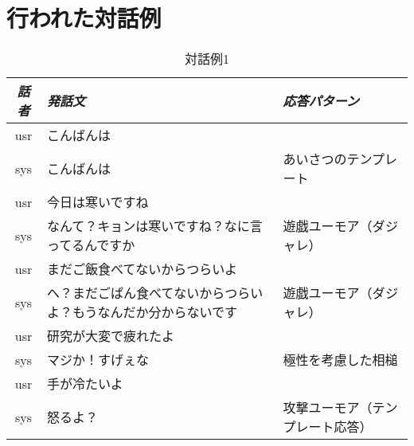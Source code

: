\section{行われた対話例}


\begin{longtable}[l]{| c | p{} | p{}|}
\caption{対話例1}
\label{fig:samplenoboke}
\endhead
\hline
{\em 話者} & {\em 発話文} & {\em 応答パターン}\\
\hline
\hline
usr & こんばんは & \\
sys & こんばんは & あいさつのテンプレート \\
usr & 今日は寒いですね & \\
sys & なんて？キョンは寒いですね？なに言ってるんですか & 遊戯ユーモア（ダジャレ） \\
usr & まだご飯食べてないからつらいよ & \\
sys & へ？まだごぱん食べてないからつらいよ？もうなんだか分からないです & 遊戯ユーモア（ダジャレ） \\
usr & 研究が大変で疲れたよ & \\
sys & マジか！すげぇな & 極性を考慮した相槌\\
usr & 手が冷たいよ & \\
sys & 怒るよ？ & 攻撃ユーモア（テンプレート応答） \\
\hline
\end{longtable}


